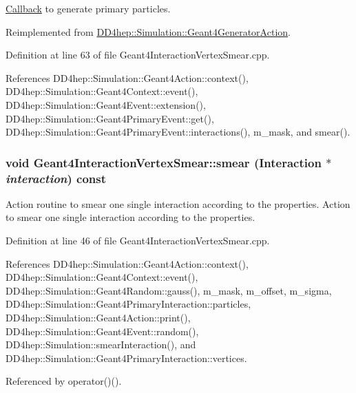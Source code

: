 \hyperlink{class_d_d4hep_1_1_callback}{Callback} to generate primary particles. 

Reimplemented from \hyperlink{class_d_d4hep_1_1_simulation_1_1_geant4_generator_action_ac5a1d2335a19e3f9d555081199e01801}{DD4hep::Simulation::Geant4GeneratorAction}.

Definition at line 63 of file Geant4InteractionVertexSmear.cpp.

References DD4hep::Simulation::Geant4Action::context(), DD4hep::Simulation::Geant4Context::event(), DD4hep::Simulation::Geant4Event::extension(), DD4hep::Simulation::Geant4PrimaryEvent::get(), DD4hep::Simulation::Geant4PrimaryEvent::interactions(), m\_\-mask, and smear().\hypertarget{class_d_d4hep_1_1_simulation_1_1_geant4_interaction_vertex_smear_add129fed64f2f13270c5e8ac99cfe73b}{
\subsubsection[{smear}]{\setlength{\rightskip}{0pt plus 5cm}void Geant4InteractionVertexSmear::smear ({\bf Interaction} $\ast$ {\em interaction}) const}}
\label{class_d_d4hep_1_1_simulation_1_1_geant4_interaction_vertex_smear_add129fed64f2f13270c5e8ac99cfe73b}


Action routine to smear one single interaction according to the properties. Action to smear one single interaction according to the properties. 

Definition at line 46 of file Geant4InteractionVertexSmear.cpp.

References DD4hep::Simulation::Geant4Action::context(), DD4hep::Simulation::Geant4Context::event(), DD4hep::Simulation::Geant4Random::gauss(), m\_\-mask, m\_\-offset, m\_\-sigma, DD4hep::Simulation::Geant4PrimaryInteraction::particles, DD4hep::Simulation::Geant4Action::print(), DD4hep::Simulation::Geant4Event::random(), DD4hep::Simulation::smearInteraction(), and DD4hep::Simulation::Geant4PrimaryInteraction::vertices.

Referenced by operator()().

